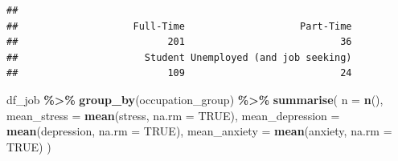 \documentclass[
]{article}
\newenvironment{Shaded}{\begin{snugshade}}{\end{snugshade}}
\newcommand{\AttributeTok}[1]{\textcolor[rgb]{0.13,0.29,0.53}{#1}}
\newcommand{\ConstantTok}[1]{\textcolor[rgb]{0.56,0.35,0.01}{#1}}
\newcommand{\FunctionTok}[1]{\textcolor[rgb]{0.13,0.29,0.53}{\textbf{#1}}}
\newcommand{\NormalTok}[1]{#1}
\newcommand{\OtherTok}[1]{\textcolor[rgb]{0.56,0.35,0.01}{#1}}
\newcommand{\SpecialCharTok}[1]{\textcolor[rgb]{0.81,0.36,0.00}{\textbf{#1}}}
\newcommand{\StringTok}[1]{\textcolor[rgb]{0.31,0.60,0.02}{#1}}
\begin{document}
\begin{Shaded}
\end{Shaded}

\begin{verbatim}
## 
##                    Full-Time                    Part-Time 
##                          201                           36 
##                      Student Unemployed (and job seeking) 
##                          109                           24
\end{verbatim}

\begin{Shaded}
\begin{Highlighting}[]
\NormalTok{df\_job }\SpecialCharTok{\%\textgreater{}\%}
  \FunctionTok{group\_by}\NormalTok{(occupation\_group) }\SpecialCharTok{\%\textgreater{}\%}
  \FunctionTok{summarise}\NormalTok{(}
    \AttributeTok{n =} \FunctionTok{n}\NormalTok{(),}
    \AttributeTok{mean\_stress =} \FunctionTok{mean}\NormalTok{(stress, }\AttributeTok{na.rm =} \ConstantTok{TRUE}\NormalTok{),}
    \AttributeTok{mean\_depression =} \FunctionTok{mean}\NormalTok{(depression, }\AttributeTok{na.rm =} \ConstantTok{TRUE}\NormalTok{),}
    \AttributeTok{mean\_anxiety =} \FunctionTok{mean}\NormalTok{(anxiety, }\AttributeTok{na.rm =} \ConstantTok{TRUE}\NormalTok{)}
\NormalTok{  )}
\end{Highlighting}
\end{Shaded}
\end{document}
